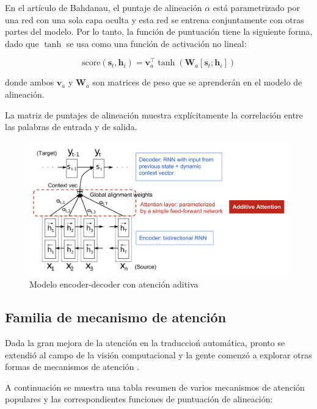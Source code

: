 \documentclass[conference]{IEEEtran}
\begin{document}
\vspace{0.2cm}

En el art\'iculo de Bahdanau, el puntaje de alineaci\'on $\alpha$ est\'a parametrizado por una red  con una sola capa oculta y esta red se entrena conjuntamente con otras partes del modelo. Por lo tanto, la funci\'on de puntuaci\'on tiene la siguiente forma, dado que $\tanh$ se usa como una funci\'on de activaci\'on no lineal:

\[
\text{score}(\boldsymbol{s}_t, \boldsymbol{h}_i) = \mathbf{v}_a^\top \tanh(\mathbf{W}_a[\boldsymbol{s}_t; \boldsymbol{h}_i])
\]

donde ambos $\mathbf{v}_a$ y $\mathbf{W}_a$ son matrices de peso que se aprender\'an en el modelo de alineaci\'on.

La matriz de puntajes de alineaci\'on muestra expl\'icitamente la correlaci\'on entre las palabras de entrada y de salida.


\begin{figure}[h]
	\centering
	\includegraphics[scale=.28]{imagenes/encoder-decoder-attention.png}
	\caption{Modelo encoder-decoder con atenci\'on aditiva} 
\end{figure}

\subsection{Familia de mecanismo de atenci\'on}

Dada la gran mejora de la atenci\'on en la traduccio\'n autom\'atica, pronto se extendi\'o al campo de la visi\'on computacional \cite{b5} y la gente comenz\'o a explorar otras formas de mecanismos de atenci\'on \cite{b1, b4, b7}.  

A continuaci\'on se muestra una tabla resumen de varios mecanismos de atenci\'on populares y las correspondientes funciones de puntuación de alineaci\'on:
\end{document}

